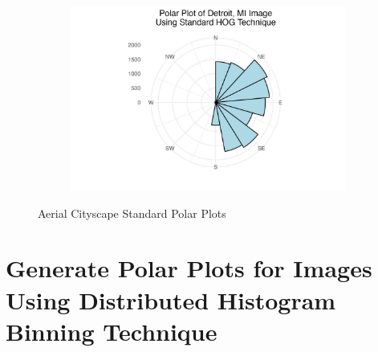 \documentclass[
  letterpaper,
  DIV=11,
  numbers=noendperiod]{scrreprt}
\begin{document}
\begin{figure}
\begin{minipage}{0.33\linewidth}
\begin{figure}[H]
{}


\end{figure}%

\end{minipage}%
%
\begin{minipage}{0.33\linewidth}

\begin{figure}[H]

{\centering \includegraphics{images/plots/aerial_cities/detroit_standard_polar_plot.jpg}

}


\end{figure}%

\end{minipage}%

\caption{\label{fig-city-standard-polar}Aerial Cityscape Standard Polar
Plots}

\end{figure}%

\section{Generate Polar Plots for Images Using Distributed Histogram
Binning
Technique}\label{generate-polar-plots-for-images-using-distributed-histogram-binning-technique}
\end{document}
